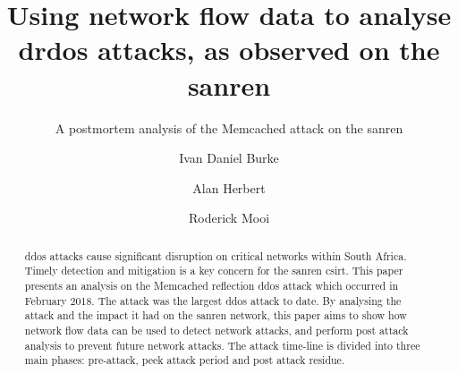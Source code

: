 \documentclass[sigconf]{acmart}
\begin{document}
\title{Using network flow data to analyse \gls{drdos} attacks, as observed on the \gls{sanren}}
\subtitle{A postmortem analysis of the Memcached attack on the \gls{sanren}}


\author{Ivan Daniel Burke}

\author{Alan Herbert}


\author{Roderick Mooi}


\renewcommand{\shortauthors}{I. Burke et al.}
\renewcommand{\shorttitle}{Using network flow data to analyse \gls{drdos} attacks}

\begin{abstract}
\gls{ddos} attacks cause significant disruption on critical networks within South Africa. Timely detection and mitigation is a key concern for the \gls{sanren} \gls{csirt}. This paper presents an analysis on the Memcached reflection \gls{ddos} attack which occurred in February 2018. The attack was the largest \gls{ddos} attack to date. By analysing the attack and the impact it had on the \gls{sanren} network, this paper aims to show how network flow data can be used to detect network attacks, and perform post attack analysis to prevent future network attacks. The attack time-line is divided into three main phases: pre-attack, peek attack period and post attack residue. 
\end{abstract}

%
%
\end{document}

